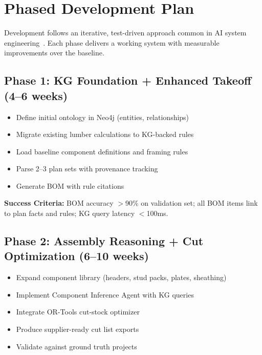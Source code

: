 
\section{Phased Development Plan}

Development follows an iterative, test-driven approach common in AI system engineering~\cite{chase2022langchain}.
Each phase delivers a working system with measurable improvements over the baseline.

\subsection{Phase 1: KG Foundation + Enhanced Takeoff (4--6 weeks)}

\begin{itemize}
  \item Define initial ontology in Neo4j (entities, relationships)
  \item Migrate existing lumber calculations to KG-backed rules
  \item Load baseline component definitions and framing rules
  \item Parse 2--3 plan sets with provenance tracking
  \item Generate BOM with rule citations
\end{itemize}

\textbf{Success Criteria:}
BOM accuracy $>$90\% on validation set; all BOM items link to plan facts and rules; KG query latency $<$100ms.

\subsection{Phase 2: Assembly Reasoning + Cut Optimization (6--10 weeks)}

\begin{itemize}
  \item Expand component library (headers, stud packs, plates, sheathing)
  \item Implement Component Inference Agent with KG queries
  \item Integrate OR-Tools cut-stock optimizer~\cite{ortools2024}
  \item Produce supplier-ready cut list exports
  \item Validate against ground truth projects
\end{itemize}

